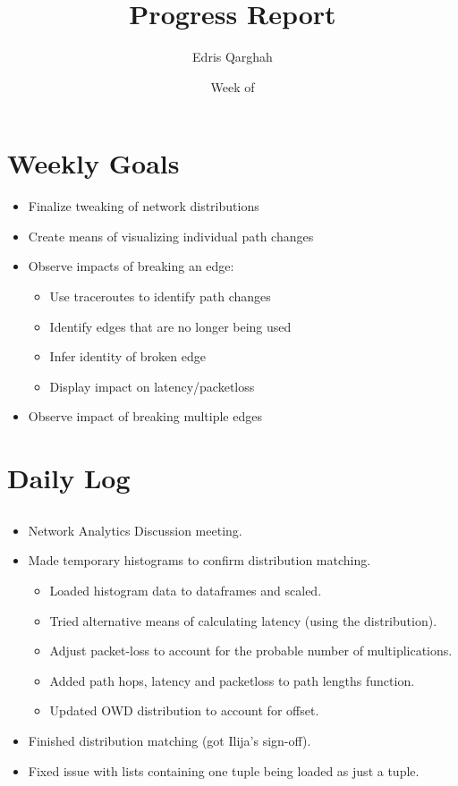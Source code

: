 \documentclass{weeklyreport}
\title{Progress Report}
\author{Edris Qarghah}
\date{Week of \DTMusedate{reportdate}}
\begin{document}
\maketitle

\newpage

\section*{Weekly Goals}


\begin{itemize}
	\item Finalize tweaking of network distributions
	\item Create means of visualizing individual path changes
	\item Observe impacts of breaking an edge:
	\begin{itemize}
		\item Use traceroutes to identify path changes
		\item Identify edges that are no longer being used
		\item Infer identity of broken edge
		\item Display impact on latency/packetloss
	\end{itemize}
	\item Observe impact of breaking multiple edges
\end{itemize}

\section*{Daily Log}

\subsection*{}

\begin{itemize}
    \item Network Analytics Discussion meeting.
    \item Made temporary histograms to confirm distribution matching.
    \begin{itemize}
		\item Loaded histogram data to dataframes and scaled.
		\item Tried alternative means of calculating latency (using the distribution).
		\item Adjust packet-loss to account for the probable number of multiplications.
		\item Added path hops, latency and packetloss to path lengths function.
		\item Updated OWD distribution to account for offset.
	\end{itemize}
    \item Finished distribution matching (got Ilija's sign-off).
    \item Fixed issue with lists containing one tuple being loaded as just a tuple.
\end{itemize}
\end{document}
